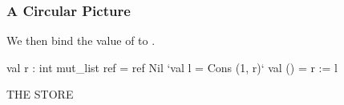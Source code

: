 \documentclass[aspectratio=169]{beamer}
\newcommand{\topthing}[2]{
      \begin{minipage}[t][#1][t]{\textwidth}
        \vspace{\fill}
        #2
        \vspace{\fill}
      \end{minipage}
    }
\begin{document}
\begin{frame}[fragile]
  \frametitle{A Circular Picture}

  \topthing{0.2in}{
    We then bind the value of \code{Cons (1, r)} to \code{l}.
  }

  \vspace{10pt}

  \begin{center}
    \begin{minipage}[t][2.1in][t]{0.55\textwidth}
      \vspace{\fill}
      \small
      \begin{codeblock}
        val r : int mut_list ref = ref Nil
        `val l = Cons (1, r)`
        val () = r := l
      \end{codeblock}
      \vspace{\fill}
    \end{minipage}
    \hfill\vline\hfill
    \begin{minipage}[t][2.1in][t]{0.35\textwidth}
      \centering
      {\hspace{-20pt}\color{gray} \large THE STORE}

      \vspace{\fill}
      \vspace{\fill}
    \end{minipage}
  \end{center}
\end{frame}
\end{document}
